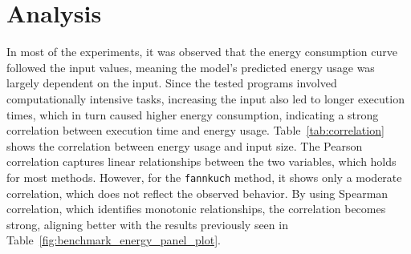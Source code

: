 \section{Analysis} \label{sec:analysis}


In most of the experiments, it was observed that the energy consumption curve followed the input values, meaning the model's predicted energy usage was largely dependent on the input. Since the tested programs involved computationally intensive tasks, increasing the input also led to longer execution times, which in turn caused higher energy consumption, indicating a strong correlation between execution time and energy usage. Table~\ref{tab:correlation} shows the correlation between energy usage and input size. The Pearson correlation captures linear relationships between the two variables, which holds for most methods. However, for the \texttt{fannkuch} method, it shows only a moderate correlation, which does not reflect the observed behavior. By using Spearman correlation, which identifies monotonic relationships, the correlation becomes strong, aligning better with the results previously seen in Table~\ref{fig:benchmark_energy_panel_plot}.


\begin{table}[htbp]
  \centering
  \footnotesize
  \setlength{\tabcolsep}{10pt} 
  \caption{Correlation between energy consumption and input. Pearson measures linear correlation, while Spearman captures monotonic (nonlinear) trends.}
  \label{tab:correlation}
\end{table}



